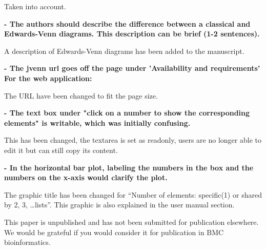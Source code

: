 \documentclass[10pt,stdletter,dateno,sigleft]{newlfm} %
\begin{document}
\begin{newlfm}
Taken into account.

\textbf{- The authors should describe the difference between a classical and
Edwards-Venn diagrams. This description can be brief (1-2 sentences).}

A description of Edwards-Venn diagrams has been added to the manuscript. 

\textbf{- The jvenn url goes off the page under 'Availability and requirements'
For the web application:}

The URL have been changed to fit the page size. 

\textbf{- The text box under "click on a number to show the corresponding
elements" is writable, which was initially confusing.}

This has been changed, the textarea is set as readonly, users are no longer able 
to edit it but can still copy its content.

\textbf{- In the horizontal bar plot, labeling the numbers in the box and the
numbers on the x-axis would clarify the plot.}

The graphic title has been changed for ``Number of elements: specific(1) or
shared by 2, 3, \ldots lists''. This graphic is also explained in the
user manual section.


This paper is unpublished and has not been submitted for publication elsewhere. 
We would be grateful if you would consider it for publication in BMC 
bioinformatics.


\end{newlfm}
\end{document}
